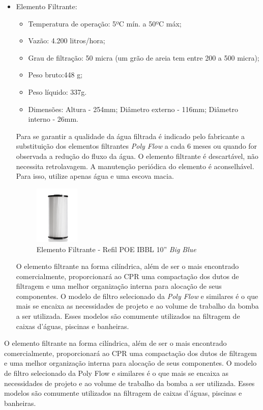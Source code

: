\begin{description}
\begin{itemize}
\begin{figure}[h]
  \end{figure}
  \FloatBarrier
  \par
  \item Elemento Filtrante:
  \begin{itemize}
    \item Temperatura de operação:  5ºC mín. a 50ºC máx;
    \item Vazão: 4.200 litros/hora;
    \item Grau de filtração: 50 micra (um grão de areia tem entre 200 a 500 micra);
    \item Peso bruto:448 g;
    \item Peso líquido: 337g.
    \item Dimensões: Altura - 254mm; Diâmetro externo - 116mm; Diâmetro interno - 26mm.
  \end{itemize}
  Para se garantir a qualidade da água filtrada é indicado pelo fabricante a
  substituição dos elementos filtrantes \textit{Poly Flow} a cada 6 meses ou quando
  for observada a redução do fluxo da água. O elemento filtrante é descartável,
  não necessita retrolavagem. A manutenção periódica do elemento é aconselhável.
  Para isso, utilize apenas água e uma escova macia.
  \par
  \begin{figure}[h]
    \centering
    \includegraphics[width=0.2\textwidth]{figures/filter.png}
    \caption{Elemento Filtrante - Refil POE IBBL 10'' \textit{Big Blue}}
    \label{fig:filter}
  \end{figure}
  \FloatBarrier
  \par
  O elemento filtrante na forma cilíndrica, além de ser o mais encontrado
  comercialmente, proporcionará ao CPR uma compactação dos dutos de filtragem
  e uma melhor organização interna para alocação de seus componentes. O modelo
  de filtro selecionado da \textit{Poly Flow} e similares é o que mais se encaixa as
  necessidades de projeto e ao volume de trabalho da bomba a ser utilizada. Esses
  modelos são comumente utilizados na filtragem de caixas d’águas, piscinas e banheiras.
\end{itemize}
\par
O elemento filtrante na forma cilíndrica, além de ser o mais encontrado
comercialmente, proporcionará ao CPR uma compactação dos dutos de filtragem e
uma melhor organização interna para alocação de seus componentes. O modelo de
filtro selecionado da Poly Flow e similares é o que mais se encaixa as
necessidades de projeto e ao volume de trabalho da bomba a ser utilizada.
Esses modelos são comumente utilizados na filtragem de caixas d’águas, piscinas
e banheiras.


\end{description}
